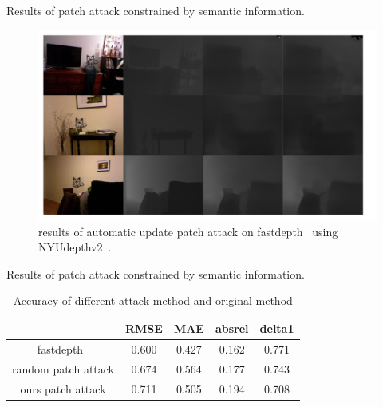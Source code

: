 \documentclass[10pt]{beamer}
\begin{document}
\begin{frame}
  Results of patch attack constrained by semantic information.
  \begin{figure}
    \includegraphics[width=1\linewidth]{figure/20211217/automatic_update_patch_attack2.pdf}
    \caption{results of automatic update patch attack on fastdepth~\cite{fastdepth}
    using NYUdepthv2~\cite{nyudepthv2}.}
  \end{figure}
\end{frame}

\begin{frame}
  Results of patch attack constrained by semantic information.
  \begin{table}
    \centering  %
    \caption{Accuracy of different attack method and original method}  %
    \label{table2}  %
    \begin{tabular}{c|c|c|c|c}  
      \hline  %
      &RMSE&MAE&absrel&delta1 \\  %
      \hline
      fastdepth~\cite{fastdepth}&0.600&0.427&0.162&0.771 \\
      random patch attack&0.674&0.564&0.177&0.743 \\
      ours patch attack&0.711&0.505&0.194&0.708 \\
      \hline
    \end{tabular}
  \end{table}
\end{frame}
\end{document}
